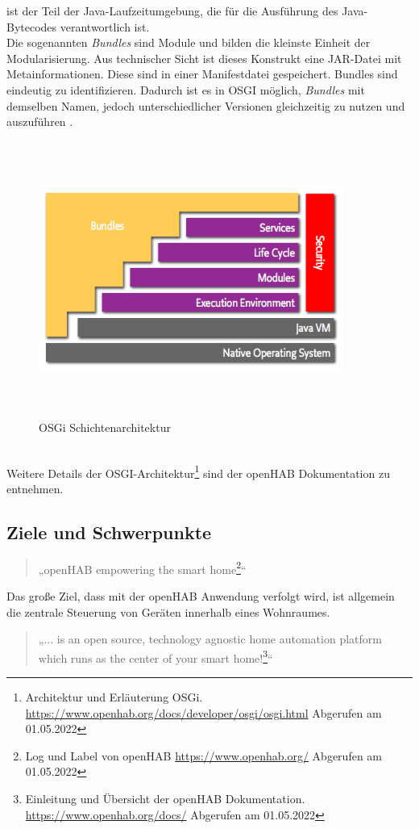     ist der Teil der Java-Laufzeitumgebung, die für die Ausführung des Java-Bytecodes verantwortlich ist.
    \\
    Die sogenannten \textit{Bundles} sind Module und bilden die kleinste Einheit der Modularisierung. Aus technischer Sicht ist 
    dieses Konstrukt eine \ac{JAR}-Datei mit Metainformationen. Diese sind in einer Manifestdatei gespeichert. Bundles sind 
    eindeutig zu identifizieren. Dadurch ist es in \acs{OSGI} möglich, \textit{Bundles} mit demselben Namen, jedoch unterschiedlicher 
    Versionen gleichzeitig zu nutzen und auszuführen \cite{openHAB-article}. 
    \begin{figure}[hbt!]
        \centering
        \includegraphics[width=10cm,height=9cm,keepaspectratio]{images/osgi-architecture.png}
        \caption{OSGi Schichtenarchitektur \cite{openhab-osgi}}
        \label{fig:osgilayer}
    \end{figure}
    \\
    \pagebreak
    \linebreak
    Weitere Details der \acs{OSGI}-Architektur\footnote{Architektur und Erläuterung OSGi. \url{https://www.openhab.org/docs/developer/osgi/osgi.html} Abgerufen am 01.05.2022} 
    sind der openHAB Dokumentation zu entnehmen.

\subsection{Ziele und Schwerpunkte} 
    \begin{quote}
        „openHAB empowering the smart home\footnote{Log und Label von openHAB \url{https://www.openhab.org/} Abgerufen am 01.05.2022}“
    \end{quote}
    Das große Ziel, dass mit der openHAB Anwendung verfolgt wird, ist allgemein die zentrale Steuerung von Geräten innerhalb eines 
    Wohnraumes.
    \begin{quote}
        „... is an open source, technology agnostic home automation platform which runs as the center of your smart home!\footnote{Einleitung und Übersicht der openHAB Dokumentation. \url{https://www.openhab.org/docs/} Abgerufen am 01.05.2022}“
    \end{quote}
    
